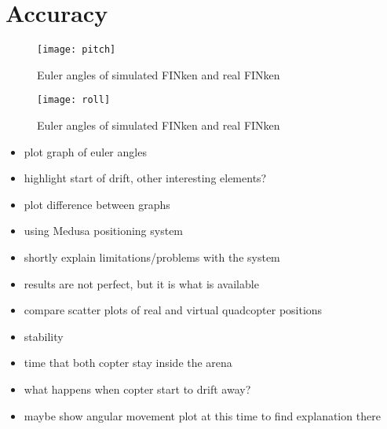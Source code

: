 \section{Accuracy}
\begin{figure}
\begin{center}
\texttt{[image: pitch]}
\caption{Euler angles of simulated FINken and real FINken}
\label{pic:pitchResponse}
\end{center}
\end{figure}
\begin{figure}
\begin{center}
\texttt{[image: roll]}
\caption{Euler angles of simulated FINken and real FINken}
\label{pic:rollResponse}
\end{center}
\end{figure}
\begin{itemize}
\item{plot graph of euler angles}
\item{highlight start of drift, other interesting elements?}
\item{plot difference between graphs}
\end{itemize}
\begin{itemize}

\item{using Medusa positioning system}
\item{shortly explain limitations/problems with the system}
\item{results are not perfect, but it is what is available}
\item{compare scatter plots of real and virtual quadcopter positions}
\end{itemize}

\begin{itemize}
\item{stability}
\item{time that both copter stay inside the arena}
\item{what happens when copter start to drift away?}
\item{maybe show angular movement plot at this time to find explanation there}
\end{itemize}





